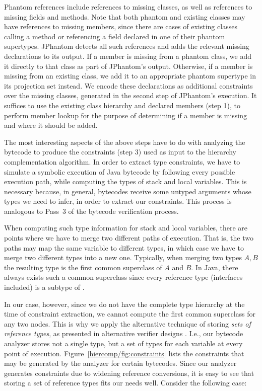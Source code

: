 Phantom references include references to missing classes, as well as
references to missing fields and methods. Note that both phantom and
existing classes may have references to missing members, since there
are cases of existing classes calling a method or referencing a field
declared in one of their phantom supertypes. JPhantom detects all such
references and adds the relevant missing declarations to its
output. If a member is missing from a phantom class, we add it
directly to that class as part of JPhantom's output. Otherwise, if a
member is missing from an existing class, we add it to an appropriate
phantom supertype in its projection set instead. We encode these
declarations as additional constraints over the missing classes,
generated in the second step of JPhantom's execution. It suffices to
use the existing class hierarchy and declared members (step 1), to
perform member lookup for the purpose of determining if a member is
missing and where it should be added.

The most interesting aspects of the above steps have to do with
analyzing the bytecode to produce the constraints (step 3) used as
input to the hierarchy complementation algorithm. In order to extract
type constraints, we have to simulate a symbolic execution of Java
bytecode by following every possible execution path, while computing
the types of stack and local variables. This is necessary because, in
general, bytecodes receive some untyped arguments whose types we need
to infer, in order to extract our constraints. This process is
analogous to Pass~3 \cite[Section~4.9.2]{Lindholm:1999:JVM:553607} of
the bytecode verification process.

When computing such type information for stack and local variables,
there are points where we have to merge two different paths of
execution. That is, the two paths may map the same variable to
different types, in which case we have to merge two different types
into a new one. Typically, when merging two types $A,B$ the resulting
type is the first common superclass of $A$ and $B$. In Java, there
always exists such a common superclass since every reference type
(interfaces included) is a subtype of .

In our case, however, since we do not have the complete type hierarchy
at the time of constraint extraction, we cannot compute the first
common superclass for any two nodes. This is why we apply the
alternative technique of storing \emph{sets of reference types}, as
presented in alternative verifier
designs \cite{Stark00theproblem}. I.e., our bytecode analyzer stores
not a single type, but a set of types for each variable at every point
of execution. Figure~\ref{hiercomp/fig:constraints} lists the constraints that
may be generated by the analyzer for certain bytecodes. Since our
analyzer generates constraints due to widening reference conversions,
it is easy to see that storing a set of reference types fits our needs
well. Consider the following case:

